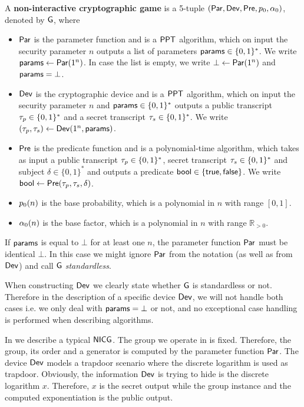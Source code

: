 \begin{defn}
	A \textbf{non-interactive cryptographic game} is a 5-tuple $\left(\operatorname{\mathsf{Par}},\operatorname{\mathsf{Dev}},\operatorname{\mathsf{Pre}},p_{0},\alpha_{0}\right)$, denoted by $\operatorname{\mathsf{G}}$, where
	\begin{itemize}
	\itemsep-0.1em
		\item $\operatorname{\mathsf{Par}}$ is the parameter function and is a $\mathsf{PPT}$ algorithm, which on input the security parameter $n$ outputs a list of parameters $\mathsf{params}\in\{0,1\}^*$. We write $\mathsf{params}\leftarrow \operatorname{\mathsf{Par}}(1^n)$. In case the list is empty, we write $\bot\leftarrow\operatorname{\mathsf{Par}}(1^n)$ and $\mathsf{params}=\bot$. 
		\item $\operatorname{\mathsf{Dev}}$ is the cryptographic device and is a $\mathsf{PPT}$ algorithm, which on input the security parameter $n$ and $\mathsf{params}\in\{0,1\}^*$ outputs a public transcript $\tau_p\in\{0,1\}^*$ and a secret transcript $\tau_s\in\{0,1\}^*$. We write $(\tau_p,\tau_s)\leftarrow \operatorname{\mathsf{Dev}}(1^n,\mathsf{params})$.
		\item $\operatorname{\mathsf{Pre}}$ is the predicate function and is a polynomial-time algorithm, which takes as input a public transcript $\tau_p\in\{0,1\}^*$, secret transcript $\tau_s\in\{0,1\}^*$ and subject $\delta\in\{0,1\}^*$ and outputs a predicate $\mathsf{bool}\in\{\mathsf{true},\mathsf{false}\}$. We write $\mathsf{bool}\leftarrow \operatorname{\mathsf{Pre}}(\tau_p,\tau_s,\delta)$.
		\item $p_{0}(n)$ is the base probability, which is a polynomial in $n$ with range $[0,1]$.
		\item $\alpha_{0}(n)$ is the base factor, which is a polynomial in $n$ with range $\mathbb{R}_{>0}$. 
	\end{itemize}  
	If $\mathsf{params}$ is equal to $\bot$ for at least one $n$, the parameter function $\operatorname{\mathsf{Par}}$ must be identical $\bot$. In this case we might ignore $\operatorname{\mathsf{Par}}$ from the notation (as well as from $\operatorname{\mathsf{Dev}}$) and call $\operatorname{\mathsf{G}}$ \emph{standardless}. 
\end{defn}

When constructing $\operatorname{\mathsf{Dev}}$ we clearly state whether $\operatorname{\mathsf{G}}$ is standardless or not. Therefore in the description of a specific device $\operatorname{\mathsf{Dev}}$, we will not handle both cases i.e. we only deal with $\mathsf{params}=\bot$ or not, and no exceptional case handling is performed when describing algorithms. 

In  we describe a typical $\mathsf{NICG}$. The group we operate in is fixed. Therefore, the group, its order and a generator is computed by the parameter function $\operatorname{\mathsf{Par}}$. The device $\operatorname{\mathsf{Dev}}$ models a trapdoor scenario where the discrete logarithm is used as trapdoor. Obviously, the information $\operatorname{\mathsf{Dev}}$ is trying to hide is the discrete logarithm $x$. Therefore, $x$ is the secret output while the group instance and the computed exponentiation is the public output. 

